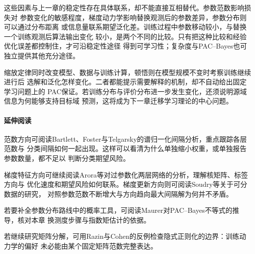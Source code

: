 这些因素与上一章的稳定性存在具体联系，却不能直接互相替代。参数范数影响损失对
参数变化的敏感程度，梯度动力学影响替换观测后的参数差异，参数分布则可以通过分布距离
或信息量联系期望泛化差。训练过程中参数移动较小，与替换一个训练观测后算法输出变化
较小，是两个不同的比较。只有把这种比较和经验优化误差都控制住，才可沿稳定性途径
得到可学习性；复杂度与PAC--Bayes也可独立提供其他充分途径。

缩放定律同时改变模型、数据与训练计算，顿悟则在模型规模不变时考察训练继续进行后
选解和泛化怎样变化。二者都能提示需要解释的机制，却不自动给出固定学习问题上的
PAC保证。若训练分布与评价分布进一步发生变化，还须说明源域信息为何能够支持目标域
预测，这将成为下一章迁移学习理论的中心问题。

\paragraph{延伸阅读}
范数方向可阅读Bartlett、Foster与Telgarsky的谱归一化间隔分析，重点跟踪各层范数与
分类间隔如何一起出现。这样可以看清为什么单独缩小权重，或单独报告参数数量，都不足以
判断分类期望风险。

梯度特征方向可继续阅读Arora等对过参数化两层网络的分析，理解核矩阵、标签方向与
优化速度和期望风险如何联系。梯度更新方向则可阅读Soudry等关于可分数据的研究，
对照参数范数不断增大与方向趋向最大间隔解为何并不矛盾。

若要补全参数分布路线中的概率工具，可阅读Maurer对PAC--Bayes不等式的推导，核对本章
换测度步骤与指数矩估计的依据。

若继续研究矩阵分解，可用Razin与Cohen的反例检查隐式正则化的边界：训练动力学的偏好
未必能由某个固定矩阵范数完整表达。
